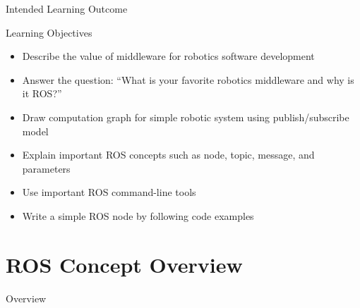 \documentclass[aspectratio=43]{beamer}
\begin{document}
\begin{frame}{Intended Learning Outcome}
	\begin{block}{Learning Objectives}
		\begin{itemize}
			\item<1> Describe the value of middleware for robotics software development
			\item<0> Answer the question: ``What is your favorite robotics middleware and why is it ROS?''
			\item<0> Draw computation graph for simple robotic system using publish/subscribe model
			\item<0> Explain important ROS concepts such as node, topic, message, and parameters
			\item<0> Use important ROS command-line tools
			\item<0> Write a simple ROS node by following code examples
		\end{itemize}
	\end{block}
\end{frame}

\section{ROS Concept Overview}
\begin{frame}[label=overview]{Overview}
	\tableofcontents[sectionstyle=show/shaded,subsectionstyle=show/shaded/shaded]
\end{frame}
\end{document}
